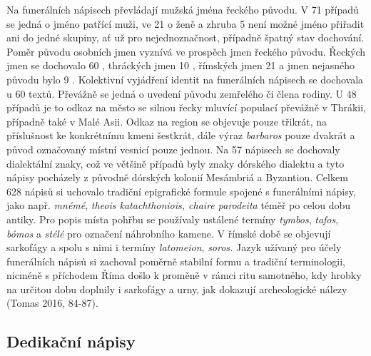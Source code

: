 Na funerálních nápisech převládají mužská jména řeckého původu. V 71  případů se jedná o jméno patřící muži, ve 21  o ženě a zhruba 5  není možné jméno přiřadit ani do jedné skupiny, ať už pro nejednoznačnost, případně špatný stav dochování. Poměr původu osobních jmen vyznívá ve prospěch jmen řeckého původu. Řeckých jmen se dochovalo 60 , thráckých jmen 10 , římských jmen 21  a jmen nejasného původu bylo 9 . Kolektivní vyjádření identit na funerálních nápisech se dochovala u 60 textů. Převážně se jedná o uvedení původu zemřelého či člena rodiny. U 48 případů je to odkaz na město se silnou řecky mluvící populací převážně v Thrákii, případně také v Malé Asii. Odkaz na region se objevuje pouze třikrát, na příslušnost ke konkrétnímu kmeni šestkrát, dále výraz {\em barbaros} pouze dvakrát a původ označovaný místní vesnicí pouze jednou. Na 57 nápisech se dochovaly dialektální znaky, což ve většině případů byly znaky dórského dialektu a tyto nápisy pocházely z původně dórských kolonií Mesámbriá a Byzantion. Celkem 628 nápisů si uchovalo tradiční epigrafické formule spojené s funerálními nápisy, jako např. {\em mnémé}, {\em theois katachthoniois, chaire parodeita} téměř po celou dobu antiky. Pro popis místa pohřbu se používaly ustálené termíny {\em tymbos}, {\em tafos}, {\em bómos} a {\em stélé} pro označení náhrobního kamene. V římské době se objevují sarkofágy a spolu s nimi i termíny {\em latomeion}, {\em soros.} Jazyk užívaný pro účely funerálních nápisů si zachoval poměrně stabilní formu a tradiční terminologii, nicméně s příchodem Říma došlo k proměně v rámci ritu samotného, kdy hrobky na určitou dobu doplnily i sarkofágy a urny, jak dokazují archeologické nálezy (Tomas 2016, 84-87).

\subsection[dedikační-nápisy]{Dedikační nápisy}

